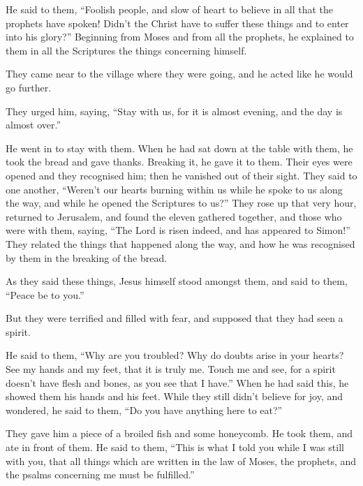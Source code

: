  He said to them, ``Foolish people, and slow of heart to
believe in all that the prophets have spoken!  Didn't the
Christ have to suffer these things and to enter into his glory?''
 Beginning from Moses and from all the prophets, he
explained to them in all the Scriptures the things concerning himself.

 They came near to the village where they were going, and
he acted like he would go further.

 They urged him, saying, ``Stay with us, for it is almost
evening, and the day is almost over.''

He went in to stay with them.  When he had sat down at the
table with them, he took the bread and gave thanks. Breaking it, he gave
it to them.  Their eyes were opened and they recognised
him; then he vanished out of their sight.  They said to one
another, ``Weren't our hearts burning within us while he spoke to us
along the way, and while he opened the Scriptures to us?'' 
They rose up that very hour, returned to Jerusalem, and found the eleven
gathered together, and those who were with them,  saying,
``The Lord is risen indeed, and has appeared to Simon!'' 
They related the things that happened along the way, and how he was
recognised by them in the breaking of the bread.

 As they said these things, Jesus himself stood amongst
them, and said to them, ``Peace be to you.''

 But they were terrified and filled with fear, and supposed
that they had seen a spirit.

 He said to them, ``Why are you troubled? Why do doubts
arise in your hearts?  See my hands and my feet, that it is
truly me. Touch me and see, for a spirit doesn't have flesh and bones,
as you see that I have.''  When he had said this, he showed
them his hands and his feet.  While they still didn't
believe for joy, and wondered, he said to them, ``Do you have anything
here to eat?''

 They gave him a piece of a broiled fish and some
honeycomb.  He took them, and ate in front of them.
 He said to them, ``This is what I told you while I was
still with you, that all things which are written in the law of Moses,
the prophets, and the psalms concerning me must be fulfilled.''

